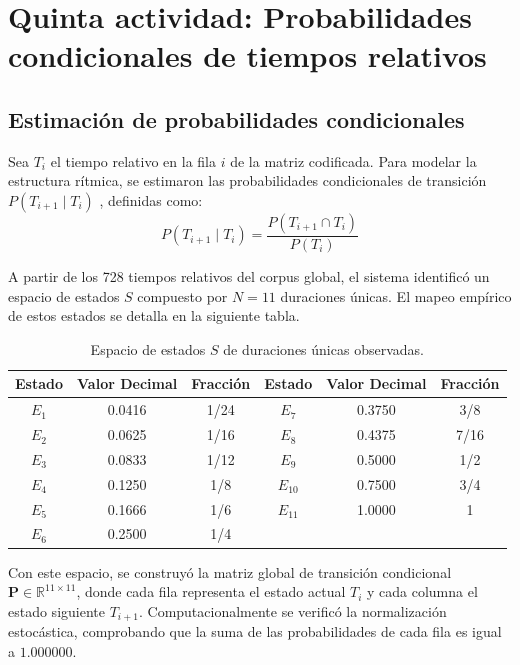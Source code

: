 \documentclass{article}
\theoremstyle{plain}
\theoremstyle{definition}
\begin{document}
\section*{Quinta actividad: Probabilidades condicionales de tiempos relativos}

\subsection*{Estimación de probabilidades condicionales}
Sea $T_i$ el tiempo relativo en la fila $i$ de la matriz codificada. Para modelar la estructura rítmica, se estimaron las probabilidades condicionales de transición $P(T_{i+1} \mid T_i)$ \cite{bertsekas, walpole}, definidas como:
$$P(T_{i+1} \mid T_i) = \frac{P(T_{i+1} \cap T_i)}{P(T_i)}$$

A partir de los 728 tiempos relativos del corpus global, el sistema identificó un espacio de estados $S$ compuesto por $N=11$ duraciones únicas. El mapeo empírico de estos estados se detalla en la siguiente tabla.

\begin{table}[h!]
\centering
\begin{tabular}{|c|c|c|c|c|c|}
\hline
\textbf{Estado} & \textbf{Valor Decimal} & \textbf{Fracción} & \textbf{Estado} & \textbf{Valor Decimal} & \textbf{Fracción} \\ \hline
$E_1$ & 0.0416 & 1/24 & $E_7$ & 0.3750 & 3/8 \\ \hline
$E_2$ & 0.0625 & 1/16 & $E_8$ & 0.4375 & 7/16 \\ \hline
$E_3$ & 0.0833 & 1/12 & $E_9$ & 0.5000 & 1/2 \\ \hline
$E_4$ & 0.1250 & 1/8  & $E_{10}$ & 0.7500 & 3/4 \\ \hline
$E_5$ & 0.1666 & 1/6  & $E_{11}$ & 1.0000 & 1 \\ \hline
$E_6$ & 0.2500 & 1/4  & \multicolumn{3}{c|}{} \\ \hline
\end{tabular}
\caption{Espacio de estados $S$ de duraciones únicas observadas.}
\label{tab:estados}
\end{table}

Con este espacio, se construyó la matriz global de transición condicional $\mathbf{P} \in \mathbb{R}^{11 \times 11}$, donde cada fila representa el estado actual $T_i$ y cada columna el estado siguiente $T_{i+1}$. Computacionalmente se verificó la normalización estocástica, comprobando que la suma de las probabilidades de cada fila es igual a $1.000000$.
\end{document}
